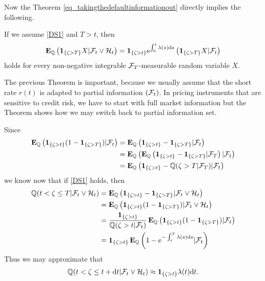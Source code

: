 Now the Theorem \ref{eq_takingthedefaultinformationout} directly implies the following.

\begin{thm}
	\label{eq_takingthedefaultinformationoutdoubly}
	If we assume \ref{DS1} and $T > t$, then 
	\begin{align}
	\operatorname{\boldsymbol{\mathrm{E}}}_{\mathbb{Q}} \left( \boldsymbol{1}_{ \{ \zeta > T \} } X | \mathcal{F}_t \vee \mathcal{H}_t \right) = \boldsymbol{1}_{ \{ \zeta > t \} } \mathrm{e}^{ \int_0^t \lambda(s) \mathrm{d} s }  \left( \boldsymbol{1}_{ \{ \zeta > T \} } X | \mathcal{F}_t \right)
	\end{align}
holds for every  non-negative integrable $\mathcal{F}_T$-measurable random variable $X$.
\end{thm}

The previous Theorem is important, because we usually assume that the short rate $r(t)$ is adapted to partial information $(\mathcal{F}_t)$. In pricing instruments that are sensitive to credit risk, we have to start with full market information but the Theorem shows how we may switch back to partial information set.

Since 
\begin{align}
\operatorname{\boldsymbol{\mathrm{E}}}_{\mathbb{Q}} \left( \boldsymbol{1}_{ \{ \zeta > t \} } (1 - \boldsymbol{1}_{ \{ \zeta > T \} } ) | \mathcal{F}_t  \right) &= \operatorname{\boldsymbol{\mathrm{E}}}_{\mathbb{Q}} \left( \boldsymbol{1}_{ \{ \zeta > t \} } - \boldsymbol{1}_{ \{ \zeta > T \} } | \mathcal{F}_t  \right) \\
&= \operatorname{\boldsymbol{\mathrm{E}}}_{\mathbb{Q}} \left( \operatorname{\boldsymbol{\mathrm{E}}}_{\mathbb{Q}} \left( \boldsymbol{1}_{ \{ \zeta > t \} } - \boldsymbol{1}_{ \{ \zeta > T \} } | \mathcal{F}_T \right) | \mathcal{F}_t  \right) \\
&= \operatorname{\boldsymbol{\mathrm{E}}}_{\mathbb{Q}} \left( \boldsymbol{1}_{ \{ \zeta > t \} } - \mathbb{Q} (\zeta > T | \mathcal{F}_T ) | \mathcal{F}_t  \right)  
\end{align}
we know now that if \ref{DS1} holds, then
\begin{align}
\mathbb{Q} ( t <\zeta \leq T | \mathcal{F}_t \vee \mathcal{H}_t ) &= \operatorname{\boldsymbol{\mathrm{E}}}_{\mathbb{Q}} \left( \boldsymbol{1}_{ \{ \zeta > t \} } - \boldsymbol{1}_{ \{ \zeta > T \} } | \mathcal{F}_t \vee \mathcal{H}_t \right) \\
&= \operatorname{\boldsymbol{\mathrm{E}}}_{\mathbb{Q}} \left( \boldsymbol{1}_{ \{ \zeta > t \} } (1 - \boldsymbol{1}_{ \{ \zeta > T \} } ) | \mathcal{F}_t \vee \mathcal{H}_t \right) \\
&= \frac{\boldsymbol{1}_{ \{ \zeta > t \} }}{\mathbb{Q} (\zeta > t | \mathcal{F}_t )} \operatorname{\boldsymbol{\mathrm{E}}}_{\mathbb{Q}} \left( \boldsymbol{1}_{ \{ \zeta > t \} } (1 - \boldsymbol{1}_{ \{ \zeta > T \} } ) | \mathcal{F}_t  \right) \\
&= \boldsymbol{1}_{ \{ \zeta > t \} } \operatorname{\boldsymbol{\mathrm{E}}}_{\mathbb{Q}} \left( 1 - \mathrm{e}^{ - \int_t^T \lambda (s) \mathrm{d} s } | \mathcal{F}_t  \right)
\end{align}
Thus we may approximate that
\begin{align}
\mathbb{Q} ( t <\zeta \leq t+ \mathrm{d} t | \mathcal{F}_t \vee \mathcal{H}_t ) \approx \boldsymbol{1}_{ \{ \zeta > t \} } \lambda (t) \mathrm{d} t .
\end{align}

